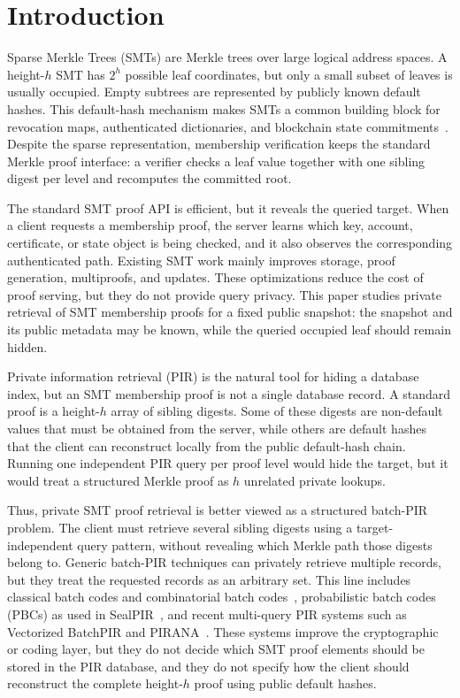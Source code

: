 \section{Introduction}
\label{sec:intro}

Sparse Merkle Trees (SMTs) are Merkle trees over large logical address spaces. A height-$h$ SMT has $2^h$ possible leaf coordinates, but only a small subset of leaves is usually occupied. Empty subtrees are represented by publicly known default hashes. This default-hash mechanism makes SMTs a common building block for revocation maps, authenticated dictionaries, and blockchain state commitments~\cite{sparsemt,revtrans,jmt,ethereum,zcash}. Despite the sparse representation, membership verification keeps the standard Merkle proof interface: a verifier checks a leaf value together with one sibling digest per level and recomputes the committed root.

The standard SMT proof API is efficient, but it reveals the queried target. When a client requests a membership proof, the server learns which key, account, certificate, or state object is being checked, and it also observes the corresponding authenticated path. Existing SMT work mainly improves storage, proof generation, multiproofs, and updates. These optimizations reduce the cost of proof serving, but they do not provide query privacy. This paper studies private retrieval of SMT membership proofs for a fixed public snapshot: the snapshot and its public metadata may be known, while the queried occupied leaf should remain hidden.

Private information retrieval (PIR) is the natural tool for hiding a database index, but an SMT membership proof is not a single database record. A standard proof is a height-$h$ array of sibling digests. Some of these digests are non-default values that must be obtained from the server, while others are default hashes that the client can reconstruct locally from the public default-hash chain. Running one independent PIR query per proof level would hide the target, but it would treat a structured Merkle proof as $h$ unrelated private lookups.

Thus, private SMT proof retrieval is better viewed as a structured batch-PIR problem. The client must retrieve several sibling digests using a target-independent query pattern, without revealing which Merkle path those digests belong to. Generic batch-PIR techniques can privately retrieve multiple records, but they treat the requested records as an arbitrary set. This line includes classical batch codes and combinatorial batch codes~\cite{batchcodes,cbc}, probabilistic batch codes (PBCs) as used in SealPIR~\cite{sealpir}, and recent multi-query PIR systems such as Vectorized BatchPIR and PIRANA~\cite{vectorbatchpir,pirana}. These systems improve the cryptographic or coding layer, but they do not decide which SMT proof elements should be stored in the PIR database, and they do not specify how the client should reconstruct the complete height-$h$ proof using public default hashes.

